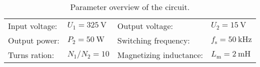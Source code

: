 
\begin{table}[htb]
    \centering  %
    \begin{tabular}{llll}
        \toprule
        Input voltage: &  $U_{\mathrm{1}} = \SI{325}{\volt}$ & Output voltage: & $U_{\mathrm{2}} = \SI{15}{\volt}$ \\ 
        Output power: & $P_{\mathrm{2}} = \SI{50}{\watt}$ & Switching frequency: & $f_{\mathrm{s}} = \SI{50}{\kilo\hertz}$ \\
        Turns ration: &  $N_{\mathrm{1}}/N_{\mathrm{2}}=10$ & Magnetizing inductance: & $L_{\mathrm{m}}=\SI{2}{\milli\henry}$  \\
        \bottomrule
    \end{tabular}
    \caption{Parameter overview of the circuit.}
    \label{table:Ex04_Forward converter with asymmetric half-bridge}
\end{table}